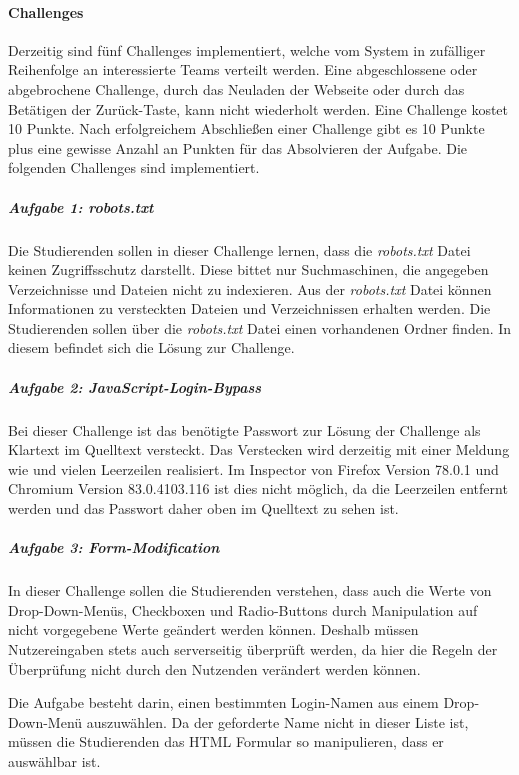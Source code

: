 \paragraph{Challenges} \label{para:Challenges}
Derzeitig sind fünf Challenges implementiert, welche vom System in zufälliger Reihenfolge an interessierte Teams verteilt werden. Eine abgeschlossene oder abgebrochene Challenge, durch das Neuladen der Webseite oder durch das Betätigen der Zurück-Taste, kann nicht wiederholt werden. Eine Challenge kostet 10 Punkte. Nach erfolgreichem Abschließen einer Challenge gibt es 10 Punkte plus eine gewisse Anzahl an Punkten für das Absolvieren der Aufgabe. Die folgenden Challenges sind implementiert. \cite[S.19-20]{abtsUeberarbeitungUndErweiterung2016}

\subparagraph{Aufgabe 1: robots.txt}\label{subpara:Aufgabe_1_robots.txt}
Die Studierenden sollen in dieser Challenge lernen, dass die \textit{robots.txt} Datei keinen Zugriffsschutz darstellt. Diese bittet nur Suchmaschinen, die angegeben Verzeichnisse und Dateien nicht zu indexieren. Aus der \textit{robots.txt} Datei können Informationen zu versteckten Dateien und Verzeichnissen erhalten werden. Die Studierenden sollen über die \textit{robots.txt} Datei einen vorhandenen Ordner finden. In diesem befindet sich die Lösung zur Challenge.

\subparagraph{Aufgabe 2: JavaScript-Login-Bypass}\label{subpara:Aufgabe_2_JavaScript-Login-Bypass}
Bei dieser Challenge ist das benötigte Passwort zur Lösung der Challenge als Klartext im Quelltext versteckt. Das Verstecken wird derzeitig mit einer Meldung wie  und vielen Leerzeilen realisiert. Im Inspector von Firefox Version 78.0.1 und Chromium Version 83.0.4103.116 ist dies nicht möglich, da die Leerzeilen entfernt werden und das Passwort daher oben im Quelltext zu sehen ist. \cite[S.20]{abtsUeberarbeitungUndErweiterung2016}

\subparagraph{Aufgabe 3: Form-Modification}\label{subpara:Aufgabe_3_Form-Modification}
In dieser Challenge sollen die Studierenden verstehen, dass auch die Werte von Drop-Down-Menüs, Checkboxen und Radio-Buttons durch Manipulation auf nicht vorgegebene Werte geändert werden können. Deshalb müssen Nutzereingaben stets auch serverseitig überprüft werden, da hier die Regeln der Überprüfung nicht durch den Nutzenden verändert werden können.

Die Aufgabe besteht darin, einen bestimmten Login-Namen aus einem Drop-Down-Menü auszuwählen. Da der geforderte Name nicht in dieser Liste ist, müssen die Studierenden das HTML Formular so manipulieren, dass er auswählbar ist. \cite[S.20]{abtsUeberarbeitungUndErweiterung2016}

